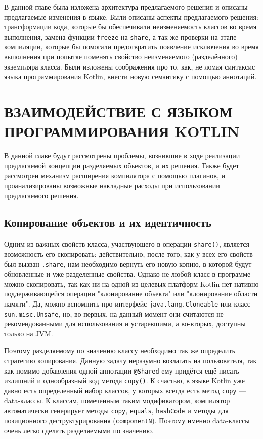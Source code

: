 \documentclass[specification,annotation,times]{itmo-student-thesis}
\newcommand{\todo}[1]{\textbf{TODO}} %
\begin{document}
В данной главе была изложена архитектура предлагаемого решения и описаны предлагаемые изменения в языке.
Были описаны аспекты предлагаемого решения: трансформации кода, которые бы обеспечивали неизменяемость классов во время выполнения, замена функции \texttt{freeze} на \texttt{share}, а так же проверки на этапе компиляции, которые бы помогали предотвратить появление исключения во время выполнения при попытке поменять свойство неизменяемого (разделённого) экземпляра класса.
Были изложены соображения про то, как, не ломая синтаксис языка программирования Kotlin, внести новую семантику с помощью аннотаций.

\chapter{ВЗАИМОДЕЙСТВИЕ С ЯЗЫКОМ ПРОГРАММИРОВАНИЯ KOTLIN}

В данной главе будут рассмотрены проблемы, возникшие в ходе реализации предлагаемой концепции разделяемых объектов, и их решения.
Также будет рассмотрен механизм расширения компилятора с помощью плагинов, и проанализированы возможные накладные расходы при использовании предлагаемого решения.



\section{Копирование объектов и их идентичность}

Одним из важных свойств класса, участвующего в операции \texttt{share()}, является возможность его скопировать: действительно, после того, как у всех его свойств был вызван \texttt{.share}, нам необходимо вернуть его новую копию, в которой будут обновленные и уже разделенные свойства.
Однако не любой класс в программе можно скопировать, так как ни на одной из целевых платформ Kotlin нет нативно поддерживающейся операции "клонирование объекта" или "клонирование области памяти". Да, можно вспомнить про интерфейс \texttt{java.lang.Cloneable} или класс \texttt{sun.misc.Unsafe}, но, во-первых, на данный момент они считаются не рекомендованными для использования и устаревшими, а во-вторых, доступны только на JVM.

Поэтому разделяемому по значению классу необходимо так же определить стратегию копирования. Данную задачу неразумно возлагать на пользователя, так как помимо добавления одной аннотации \texttt{@Shared} ему придётся ещё писать излишний и однообразный код метода \texttt{copy()}.
К счастью, в языке Kotlin уже давно есть определенный набор классов, у которых всегда есть метод \texttt{copy} --- data-классы. К классам, помеченным таким модификатором, компилятор автоматически генерирует методы \texttt{copy}, \texttt{equals}, \texttt{hashCode} и методы для позиционного деструктурирования (\texttt{componentN}).
Поэтому именно data-классы очень легко сделать разделяемыми по значению.
\end{document}
